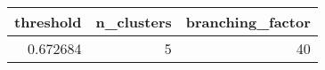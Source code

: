 \begin{tabular}{rrr}
\toprule
threshold & n_clusters & branching_factor \\
\midrule
0.672684 & 5 & 40 \\
\bottomrule
\end{tabular}
